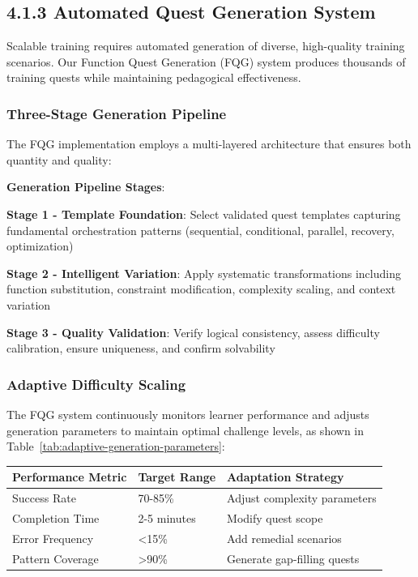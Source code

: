\subsection*{4.1.3 Automated Quest Generation System}

Scalable training requires automated generation of diverse, high-quality training scenarios. Our Function Quest Generation (FQG) system produces thousands of training quests while maintaining pedagogical effectiveness.

\subsubsection*{Three-Stage Generation Pipeline}

The FQG implementation employs a multi-layered architecture that ensures both quantity and quality:

\begin{alertbox}
\textbf{Generation Pipeline Stages}:
\begin{compactlist}
    \item \textbf{Stage 1 - Template Foundation}: Select validated quest templates capturing fundamental orchestration patterns (sequential, conditional, parallel, recovery, optimization)
    \item \textbf{Stage 2 - Intelligent Variation}: Apply systematic transformations including function substitution, constraint modification, complexity scaling, and context variation
    \item \textbf{Stage 3 - Quality Validation}: Verify logical consistency, assess difficulty calibration, ensure uniqueness, and confirm solvability
\end{compactlist}
\end{alertbox}

\subsubsection*{Adaptive Difficulty Scaling}

The FQG system continuously monitors learner performance and adjusts generation parameters to maintain optimal challenge levels, as shown in Table~\ref{tab:adaptive-generation-parameters}:

\begin{center}
\begin{tabular}{@{}lll@{}}
\toprule
\textbf{Performance Metric} & \textbf{Target Range} & \textbf{Adaptation Strategy} \\
\midrule
Success Rate & 70-85\% & Adjust complexity parameters \\
Completion Time & 2-5 minutes & Modify quest scope \\
Error Frequency & <15\% & Add remedial scenarios \\
Pattern Coverage & >90\% & Generate gap-filling quests \\
\bottomrule
\end{tabular}
\label{tab:adaptive-generation-parameters}
\end{center}

